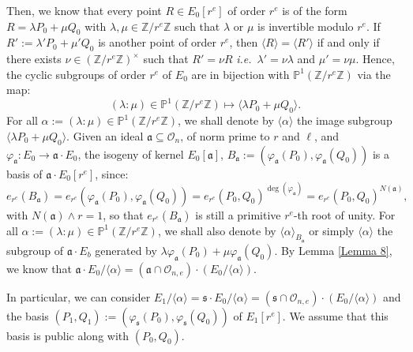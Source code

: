 \documentclass[a4paper,10pt]{report}
\theoremstyle{definition}
\theoremstyle{plain}
\theoremstyle{definition}
\newcommand{\ie}{\emph{i.e.}\ }
\newcommand{\Z}{\mathbb{Z}}
\newcommand{\mO}{\mathcal{O}}
\renewcommand{\(}{\left(}
\renewcommand{\)}{\right)}
\renewcommand{\P}{\mathbb{P}}
\newcommand{\mf}[1]{\mathfrak{#1}}
\begin{document}
Then, we know that every point $R\in E_0[r^e]$ of order $r^e$ is of the form $R=\lambda P_0+\mu Q_0$ with $\lambda,\mu\in\Z/r^e\Z$ such that $\lambda$ or $\mu$ is invertible modulo $r^e$.  If $R':=\lambda'P_0+\mu'Q_0$ is another point of order $r^e$, then $\langle R\rangle=\langle R'\rangle$ if and only if there exists $\nu\in(\Z/r^e\Z)^\times$ such that $R'=\nu R$ \ie  $\lambda'=\nu\lambda$ and $\mu'=\nu\mu$. Hence, the cyclic subgroups of order $r^e$ of $E_0$ are in bijection with $\P^1(\Z/r^e\Z)$ via the map:
\[(\lambda:\mu)\in\P^1(\Z/r^e\Z)\longmapsto \langle \lambda P_0+\mu Q_0\rangle.\]
For all $\alpha:=(\lambda:\mu)\in\P^1(\Z/r^e\Z)$, we shall denote by $\langle\alpha\rangle$ the image subgroup $\langle \lambda P_0+\mu Q_0\rangle$. Given an ideal $\mf{a}\subseteq \mO_n$, of norm prime to $r$ and $\ell$, and $\varphi_{\mf{a}}: E_0\longrightarrow \mf{a}\cdot E_0$, the isogeny of kernel $E_0[\mf{a}]$, $B_{\mf{a}}:=(\varphi_{\mf{a}}(P_0), \varphi_{\mf{a}}(Q_0))$ is a basis of $\mf{a}\cdot E_0[r^e]$, since:
\[e_{r^e}(B_{\mf{a}})=e_{r^e}(\varphi_{\mf{a}}(P_0), \varphi_{\mf{a}}(Q_0))=e_{r^e}(P_0,Q_0)^{\deg(\varphi_{\mf{a}})}=e_{r^e}(P_0,Q_0)^{N(\mf{a})},\]
with $N(\mf{a})\wedge r=1$, so that $e_{r^e}(B_{\mf{a}})$ is still a primitive $r^e$-th root of unity.  For all $\alpha:=(\lambda:\mu)\in\P^1(\Z/r^e\Z)$, we shall also denote by $\langle \alpha\rangle_{B_{\mf{a}}}$ or simply $\langle \alpha\rangle$ the subgroup of $\mf{a}\cdot E_b$ generated by $\lambda\varphi_{\mf{a}}(P_0)+\mu\varphi_{\mf{a}}(Q_0)$. By Lemma \ref{Lemma 8}, we know that $\mf{a}\cdot E_0/\langle\alpha\rangle=(\mf{a}\cap\mO_{n,e})\cdot(E_0/\langle\alpha\rangle)$. 

In particular, we can consider $E_1/\langle\alpha\rangle=\mf{s}\cdot E_0/\langle\alpha\rangle=(\mf{s}\cap\mO_{n,e})\cdot(E_0/\langle\alpha\rangle)$ and the basis $(P_1,Q_1):=(\varphi_{\mf{s}}(P_0), \varphi_{\mf{s}}(Q_0))$ of $E_1[r^e]$. We assume that this basis is public along with $(P_0,Q_0)$. 
\end{document}
